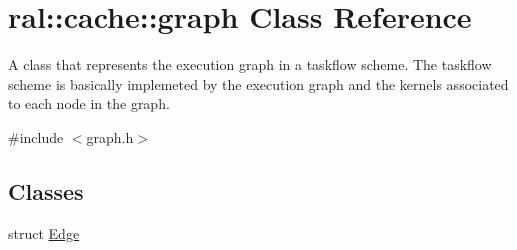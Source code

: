 \hypertarget{classral_1_1cache_1_1graph}{}\section{ral\+:\+:cache\+:\+:graph Class Reference}
\label{classral_1_1cache_1_1graph}


A class that represents the execution graph in a taskflow scheme. The taskflow scheme is basically implemeted by the execution graph and the kernels associated to each node in the graph.  




{\ttfamily \#include $<$graph.\+h$>$}

\subsection*{Classes}
\begin{DoxyCompactItemize}
\item 
struct \hyperlink{structral_1_1cache_1_1graph_1_1Edge}{Edge}
\end{DoxyCompactItemize}
